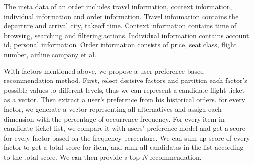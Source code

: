 \documentclass{sig-alternate-05-2015}
\begin{document}
The meta data of an order includes travel information, context information, individual information and order information. Travel information contains the departure and arrival city, takeoff time. Context information contains time of browsing, searching and filtering actions. Individual information contains account id, personal information. Order information consists of price, seat class, flight number, airline company  et al.\par

With factors mentioned above, we propose a user preference based recommendation method. First, select decisive factors and partition each factor's possible values to different levels, thus we can represent a candidate flight ticket as a vector. Then extract a user's preference from his historical orders, for every factor, we generate a vector representing all alternatives and assign each dimension with the percentage of occurrence frequency. For every item in candidate ticket list, we compare it with users' preference model and get a score for every factor based on the frequency percentage. We can sum up score of every factor to get a total score for item, and rank all candidates in the list according to the total score. We can then provide a top-$N$ recommendation.\par
\end{document}
